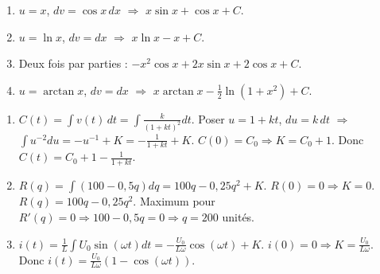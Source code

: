 \documentclass[11pt]{article}
\begin{document}
\begin{corrige}[Entraînement 3]
\begin{enumerate}
    \item $u=x$, $dv=\cos x\,dx$ $\Rightarrow$ $x\sin x + \cos x + C$.
    \item $u=\ln x$, $dv=dx$ $\Rightarrow$ $x\ln x - x + C$.
    \item Deux fois par parties : $-x^2\cos x + 2x\sin x + 2\cos x + C$.
    \item $u=\arctan x$, $dv=dx$ $\Rightarrow$ $x\arctan x - \frac{1}{2}\ln(1+x^2) + C$.
\end{enumerate}
\end{corrige}

\begin{corrige}[Entraînement 4]
\begin{enumerate}
    \item $C(t) = \int v(t)\,dt = \int \frac{k}{(1+kt)^2} dt$. Poser $u=1+kt$, $du=k\,dt$ $\Rightarrow$ $\int u^{-2} du = -u^{-1} + K = -\frac{1}{1+kt} + K$. $C(0)=C_0 \Rightarrow K = C_0 + 1$. Donc $C(t) = C_0 + 1 - \frac{1}{1+kt}$.
    \item $R(q) = \int (100 - 0,5q) dq = 100q - 0,25q^2 + K$. $R(0)=0 \Rightarrow K=0$. $R(q) = 100q - 0,25q^2$. Maximum pour $R'(q)=0 \Rightarrow 100 - 0,5q=0 \Rightarrow q=200$ unités.
    \item $i(t) = \frac{1}{L}\int U_0 \sin(\omega t) dt = -\frac{U_0}{L\omega}\cos(\omega t) + K$. $i(0)=0 \Rightarrow K = \frac{U_0}{L\omega}$. Donc $i(t) = \frac{U_0}{L\omega}(1 - \cos(\omega t))$.
\end{enumerate}
\end{corrige}
\end{document}
